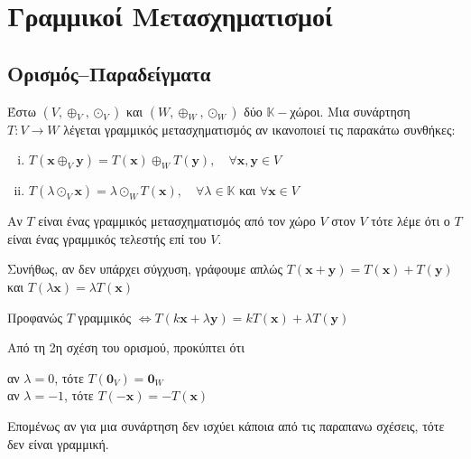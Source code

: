 



\let\vec\mathbf
\DeclareMathOperator{\Span}{span}
\pagestyle{vangelis}




\chapter{Γραμμικοί Μετασχηματισμοί}

\section{Ορισμός--Παραδείγματα}


\begin{dfn}
  Έστω $ (V, \oplus _{V}, \odot _{V}) $ και $ (W, \oplus _{W}, \odot _{W}) $ δύο 
  $ \mathbb{K} - $χώροι. Μια συνάρτηση $ T \colon V \to W $ λέγεται 
  \textcolor{Col1}{γραμμικός μετασχηματισμός} αν ικανοποιεί τις παρακάτω συνθήκες:
  \begin{enumerate}[(i)]
    \item $ T(\mathbf{x} \oplus _{V} \mathbf{y}) = T(\mathbf{x}) \oplus _{W}
      T(\mathbf{y}), \quad \forall \mathbf{x}, \mathbf{y}  \in V $
    \item $ T(\lambda \odot _{V} \mathbf{x}) = \lambda \odot _{W} T(\mathbf{x}), 
      \quad \forall \lambda \in \mathbb{K} $ και $ \forall \mathbf{x} \in V $
  \end{enumerate}
  Αν $T$ είναι ένας γραμμικός μετασχηματισμός από τον χώρο $V$ στον $V$ τότε λέμε 
  ότι ο $T$ είναι ένας \textcolor{Col1}{γραμμικός τελεστής} επί του $V$. 
\end{dfn}

\begin{rem}
\item {}
  \begin{myitemize}
    \item Συνήθως, αν δεν υπάρχει σύγχυση, γράφουμε απλώς 
          $ T(\mathbf{x}+ \mathbf{y}) = T(\mathbf{x}) + T(\mathbf{y}) $ και 
          $ T(\lambda \mathbf{x}) = \lambda T(\mathbf{x}) $
    \item Προφανώς $T$ γραμμικός $ \Leftrightarrow  T(k \mathbf{x} + \lambda 
      \mathbf{y}) =k T(\mathbf{x}) + \lambda T(\mathbf{y}) $
  \end{myitemize}
\end{rem}

\begin{rem}
    Από τη 2η σχέση του ορισμού, προκύπτει ότι
      \begin{center}
        αν $ \lambda = 0 $, τότε $ T(\mathbf{0}_{V}) = \mathbf{0}_{W} $ \\
        αν $ \lambda = -1 $, τότε $T(- \mathbf{x}) = - T(\mathbf{x}) $
      \end{center}
      Επομένως αν για μια συνάρτηση δεν ισχύει κάποια από τις παραπανω σχέσεις, τότε 
      δεν είναι γραμμική.
\end{rem}

